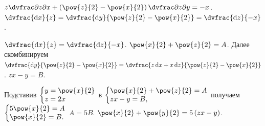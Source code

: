 \documentclass[a5paper,10pt]{article}
\begin{document}
    $z \vparder{z}{x} + \br{\pow{z}{2} - \pow{x}{2}} \vparder{z}{y} = -x$.
    $\dvfrac {\di x} {z}
    = \dvfrac {\di y} {\pow{z}{2} - \pow{x}{2}}
    = \dvfrac {\di z} {-x}$.
    
    $\dvfrac {\di x} {z} = \dvfrac {\di z} {-x}$.
    $\pow{x}{2} + \pow{z}{2} = A$.
    Далее скомбинируем
    $\dvfrac {\di y} {\pow{z}{2} - \pow{x}{2}} 
    = \dvfrac{z \di x + x \di z}{\pow{z}{2} - \pow{x}{2}}$.
    $zx - y = B$.

    Подставив $\tsys{y = \pow{x}{2} \\ z = 2x}$ в 
    $\tsys{\pow{x}{2} + \pow{z}{2} = A \\ zx - y = B,}$ получаем
    $\tsys{5\pow{x}{2} = A \\ \pow{x}{2} = B.}$
    $A = 5B$.
    $\pow{x}{2} + \pow{y}{2} = 5\br{zx - y}$.
\end{document}

